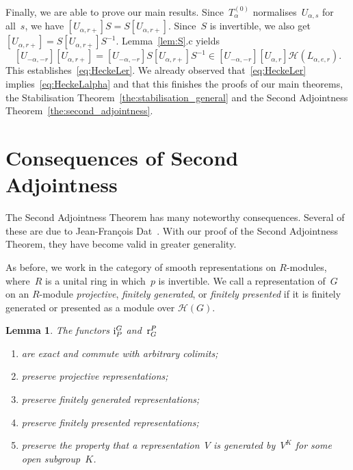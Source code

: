 \documentclass{amsart}
\newtheorem{lem}[theorem]{Lemma}
\theoremstyle{remark}
\theoremstyle{definition}
\newcommand*{\Jaci}{\textup i}%
\newcommand*{\Jacr}{\textup r}%
\newcommand*{\nb}{\nobreakdash}%
\newcommand*{\Un}{U}%
\newcommand{\ring}{R}%
\newcommand*{\Hecke}{\mathcal H}%
\begin{document}
Finally, we are able to prove our main results.  Since~\(T_\alpha^{(0)}\) normalises~\(\Un_{\alpha,s}\) for all~\(s\), we have \([\Un_{\alpha,r+}] S = S[\Un_{\alpha,r+}]\).  Since~\(S\) is invertible, we also get \([\Un_{\alpha,r+}] = S[\Un_{\alpha,r+}]S^{-1}\).  Lemma~\ref{lem:S}.c yields
\[
[\Un_{-\alpha,-r}] [\Un_{\alpha,r+}] = [\Un_{-\alpha,-r}] S [\Un_{\alpha,r+}] S^{-1}
\in [\Un_{-\alpha,-r}] [\Un_{\alpha,r}] \Hecke (L_{\alpha,e,r}).
\]
This establishes~\eqref{eq:HeckeLer}.  We already observed that~\eqref{eq:HeckeLer} implies~\eqref{eq:HeckeLalpha} and that this finishes the proofs of our main theorems, the Stabilisation Theorem~\ref{the:stabilisation_general} and the Second Adjointness Theorem~\ref{the:second_adjointness}.
\vspace{4mm}




\section{Consequences of Second Adjointness}
\label{sec:consequences}

The Second Adjointness Theorem has many noteworthy consequences.  Several of these are due to Jean-Fran\c{c}ois Dat~\cite{Dat:Finitude}.  With our proof of the Second Adjointness Theorem, they have become valid in greater generality.

As before, we work in the category of smooth representations on \(\ring\)\nb-modules, where~\(\ring\) is a unital ring in which~\(p\) is invertible.  We call a representation of~\(G\) on an \(\ring\)\nb-module \emph{projective}, \emph{finitely generated}, or \emph{finitely presented} if it is finitely generated or presented as a module over \(\Hecke(G)\).

\begin{lem}
  \label{lem:preserve-finite-type}
  The functors \(\Jaci_P^G\) and~\(\Jacr_G^P\)
  \begin{enumerate}[label=\textup{(\alph{*})}]
  \item are exact and commute with arbitrary colimits;
  \item preserve projective representations;
  \item preserve finitely generated representations;
  \item preserve finitely presented representations;
  \item preserve the property that a representation~\(V\) is generated by~\(V^K\) for some open subgroup~\(K\).
  \end{enumerate}
\end{lem}
\end{document}
